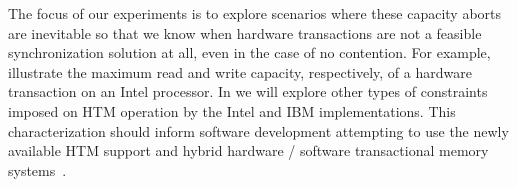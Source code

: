 The focus of our experiments is to explore scenarios where these
capacity aborts are inevitable so that we know 
when hardware transactions are
not a feasible synchronization solution at all, 
even in the case of no contention. For example, 
illustrate the maximum read and write capacity, respectively,
of a hardware transaction on an Intel processor.  In 
we will explore other types of constraints imposed on
HTM operation by the Intel and IBM implementations.
This characterization should inform
software development attempting to use the newly available HTM support 
and hybrid hardware / software transactional memory systems~\cite{???}. 
